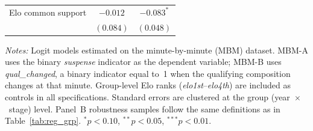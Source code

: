 \begin{table}[H]
\begin{threeparttable}
\begin{tabular}{l cc cc}
Elo common support      & \multicolumn{2}{c}{$-0.012$} & \multicolumn{2}{c}{$-0.083^{*}$} \\
                        & \multicolumn{2}{c}{$(0.084)$} & \multicolumn{2}{c}{$(0.048)$} \\
\bottomrule
\end{tabular}
\begin{tablenotes}
\small
\item \textit{Notes:} Logit models estimated on the minute-by-minute (MBM) dataset. MBM-A uses the binary \textit{suspense} indicator as the dependent variable; MBM-B uses \textit{qual\_changed}, a binary indicator equal to~1 when the qualifying composition changes at that minute. Group-level Elo ranks (\textit{elo1st}--\textit{elo4th}) are included as controls in all specifications. Standard errors are clustered at the group (year~$\times$~stage) level. Panel~B robustness samples follow the same definitions as in Table~\ref{tab:reg_grp}. $^{*}p<0.10$, $^{**}p<0.05$, $^{***}p<0.01$.
\end{tablenotes}
\end{threeparttable}
\end{table}
